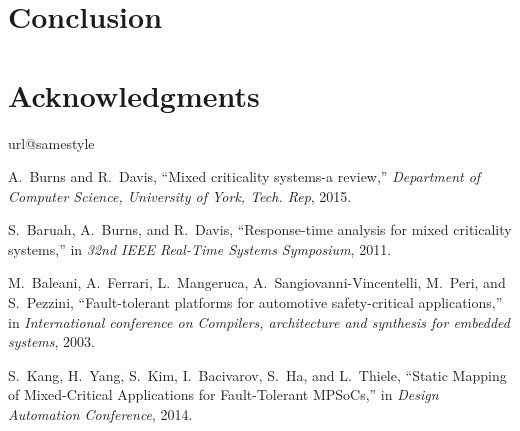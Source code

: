 \documentclass[conference]{IEEEtran}
\begin{document}
\section{Conclusion}
\label{sec:conclusion}


\section*{Acknowledgments}


\begin{thebibliography}{10}
\providecommand{\url}[1]{#1}
\csname url@samestyle\endcsname
\providecommand{\newblock}{\relax}
\providecommand{\bibinfo}[2]{#2}
\providecommand{\BIBentrySTDinterwordspacing}{\spaceskip=0pt\relax}
\providecommand{\BIBentryALTinterwordstretchfactor}{4}
\providecommand{\BIBentryALTinterwordspacing}{\spaceskip=\fontdimen2\font plus
\BIBentryALTinterwordstretchfactor\fontdimen3\font minus
  \fontdimen4\font\relax}
\providecommand{\BIBforeignlanguage}[2]{{%
\expandafter\ifx\csname l@#1\endcsname\relax
\typeout{** WARNING: IEEEtran.bst: No hyphenation pattern has been}%
\typeout{** loaded for the language `#1'. Using the pattern for}%
\typeout{** the default language instead.}%
\else
\language=\csname l@#1\endcsname
\fi
#2}}
\providecommand{\BIBdecl}{\relax}
\BIBdecl


A.~Burns and R.~Davis, ``Mixed criticality systems-a review,'' \emph{Department
  of Computer Science, University of York, Tech. Rep}, 2015.

\vspace{-0.5mm}
S.~Baruah, A.~Burns, and R.~Davis, ``Response-time analysis for mixed
  criticality systems,'' in \emph{32nd IEEE Real-Time Systems Symposium}, 2011.


\vspace{-0.5mm}
M.~Baleani, A.~Ferrari, L.~Mangeruca, A.~Sangiovanni-Vincentelli, M.~Peri, and S.~Pezzini,
 ``Fault-tolerant platforms for automotive safety-critical applications,'' in \emph{International conference
 on Compilers, architecture and synthesis for embedded systems}, 2003.



\vspace{-0.5mm}
S.~Kang, H.~Yang, S.~Kim, I.~Bacivarov, S.~Ha, and L.~Thiele,
``Static Mapping of Mixed-Critical Applications for Fault-Tolerant MPSoCs,''
in \emph{Design Automation Conference}, 2014.



\end{thebibliography}
\end{document}
